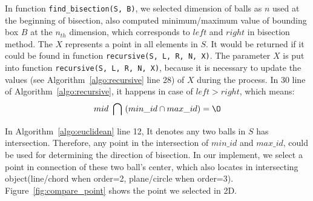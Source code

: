
In function \texttt{find\_bisection(S, B)}, we selected dimension of balls as
$n$ used at the beginning of bisection, also computed minimum/maximum value of
bounding box $B$ at the $n_{th}$ dimension, which corresponds to $left$ and $right$ in
bisection method. The $X$ represents a point in all elements in $S$. It would be
returned if it could be found in function \texttt{recursive(S, L, R, N, X)}. The parameter $X$ is put into function \texttt{recursive(S, L, R, N, X)}, because
it is necessary to update the values (see Algorithm~\ref{algo:recursive} line
28) of $X$ during the process. In 30 line of Algorithm~\ref{algo:recursive}, it
happens in case of $left > right$, which means:
\begin{equation*}
    mid \  \bigcap \  (min\_id \cap max\_id) = \O
\end{equation*}

In Algorithm~\ref{algo:euclidean} line 12, It denotes any two balls in $S$ has
intersection. Therefore, any point in the intersection of $min\_id$ and
$max\_id$, could be used for determining the direction of bisection. In our
implement, we select a point in connection of these two ball's center, which
also locates in intersecting object(line/chord when order=2, plane/circle when
order=3). Figure~\ref{fig:compare_point} shows the point we selected in 2D.





